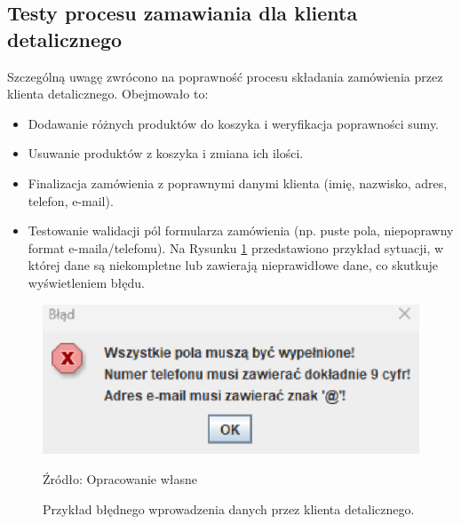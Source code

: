\vspace{1cm}

\begin{minipage}{\linewidth}
\subsection{Testy procesu zamawiania dla klienta detalicznego}
Szczególną uwagę zwrócono na poprawność procesu składania zamówienia przez klienta detalicznego. Obejmowało to:
\begin{itemize}
    \item Dodawanie różnych produktów do koszyka i weryfikacja poprawności sumy.
    \item Usuwanie produktów z koszyka i zmiana ich ilości.
    \item Finalizacja zamówienia z poprawnymi danymi klienta (imię, nazwisko, adres, telefon, e-mail).
    \item Testowanie walidacji pól formularza zamówienia (np. puste pola, niepoprawny format e-maila/telefonu). Na Rysunku \ref{fig:bledne_dane_zamowienia} przedstawiono przykład sytuacji, w której dane są niekompletne lub zawierają nieprawidłowe dane, co skutkuje wyświetleniem błędu.
\end{itemize}

\begin{figure}[H]
    \centering
    \includegraphics[width=0.5\linewidth]{figures/fig_0005.eps}
    \caption{Przykład błędnego wprowadzenia danych przez klienta detalicznego.}
    \label{fig:bledne_dane_zamowienia}
    \small{Źródło: Opracowanie własne}
\end{figure}
\end{minipage}

\vspace{1cm}



